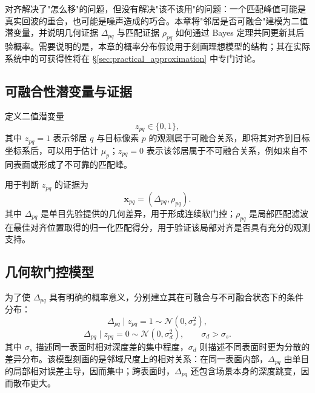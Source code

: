 \documentclass[11pt,a4paper]{ctexart}
\numberwithin{equation}{section}
\newcommand{\N}{\mathcal{N}}
\begin{document}
对齐解决了"怎么移"的问题，但没有解决"该不该用"的问题：一个匹配峰值可能是真实回波的重合，也可能是噪声造成的巧合。本章将"邻居是否可融合"建模为二值潜变量，并说明几何证据 $\Delta_{pq}$ 与匹配证据 $\rho_{pq}$ 如何通过 Bayes 定理共同更新其后验概率。需要说明的是，本章的概率分布假设用于刻画理想模型的结构；其在实际系统中的可获得性将在 \S\ref{sec:practical_approximation} 中专门讨论。

\subsection{可融合性潜变量与证据}

定义二值潜变量
\begin{equation}
    z_{pq}\in\{0,1\},
    \label{eq:z_definition}
\end{equation}
其中 $z_{pq}=1$ 表示邻居 $q$ 与目标像素 $p$ 的观测属于可融合关系，即将其对齐到目标坐标系后，可以用于估计 $\mu_p$；$z_{pq}=0$ 表示该邻居属于不可融合关系，例如来自不同表面或形成了不可靠的匹配峰。

用于判断 $z_{pq}$ 的证据为
\begin{equation}
    \bm x_{pq}
    =
    (\Delta_{pq},\rho_{pq}).
    \label{eq:evidence_pair}
\end{equation}
其中 $\Delta_{pq}$ 是单目先验提供的几何差异，用于形成连续软门控；$\rho_{pq}$ 是局部匹配滤波在最佳对齐位置取得的归一化匹配得分，用于验证该局部对齐是否具有充分的观测支持。

\subsection{几何软门控模型}

为了使 $\Delta_{pq}$ 具有明确的概率意义，分别建立其在可融合与不可融合状态下的条件分布：
\begin{equation}
    \Delta_{pq}\mid z_{pq}=1
    \sim
    \N(0,\sigma_s^2),
    \label{eq:delta_same}
\end{equation}
\begin{equation}
    \Delta_{pq}\mid z_{pq}=0
    \sim
    \N(0,\sigma_d^2),
    \qquad
    \sigma_d>\sigma_s.
    \label{eq:delta_diff}
\end{equation}
其中 $\sigma_s$ 描述同一表面时相对深度差的集中程度，$\sigma_d$ 则描述不同表面时更为分散的差异分布。该模型刻画的是邻域尺度上的相对关系：在同一表面内部，$\Delta_{pq}$ 由单目的局部相对误差主导，因而集中；跨表面时，$\Delta_{pq}$ 还包含场景本身的深度跳变，因而散布更大。
\end{document}
